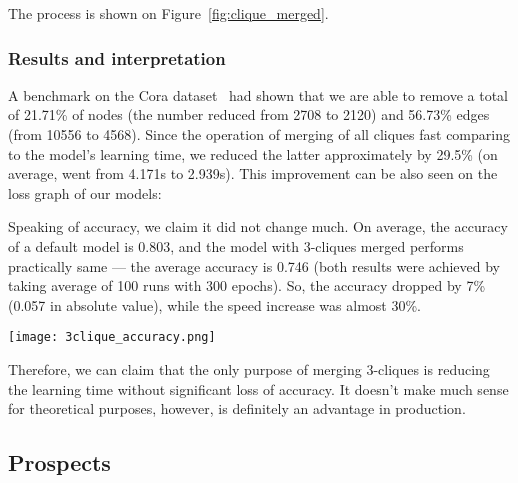 The process is shown on Figure~\ref{fig:clique_merged}.

\subsubsection*{Results and interpretation}

A benchmark on the Cora dataset~\cite{cora_dataset} had shown that we are able to remove a total of 21.71\% of nodes (the number reduced from 2708 to 2120) and 56.73\% edges (from 10556 to 4568).
Since the operation of merging of all cliques fast comparing to the model's learning time, we reduced the latter approximately by 29.5\% (on average, went from 4.171s to 2.939s).
This improvement can be also seen on the loss graph of our models:

Speaking of accuracy, we claim it did not change much.
On average, the accuracy of a default model is 0.803, and the model with 3-cliques merged performs practically same --- the average accuracy is 0.746 (both results were achieved by taking average of 100 runs with 300 epochs).
So, the accuracy dropped by 7\% (0.057 in absolute value), while the speed increase was almost 30\%.

\begin{center}
	\texttt{[image: 3clique\_accuracy.png]}
\end{center}

Therefore, we can claim that the only purpose of merging 3-cliques is reducing the learning time without significant loss of accuracy.
It doesn't make much sense for theoretical purposes, however, is definitely an advantage in production.


\subsection{Prospects}


